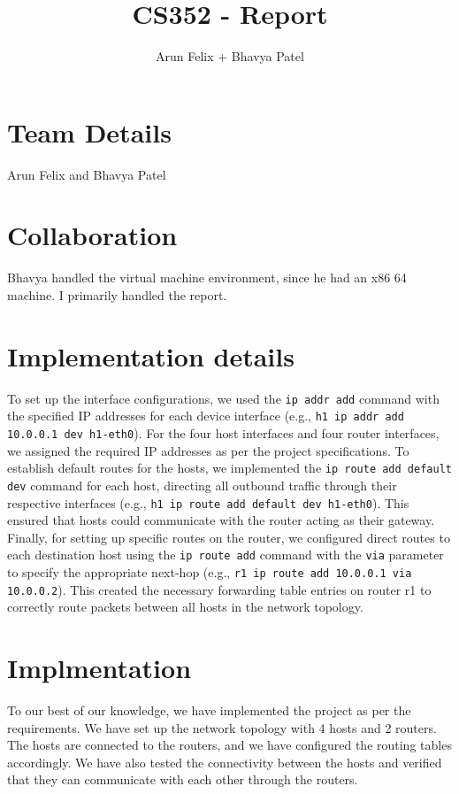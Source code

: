 \documentclass{article}
\title{CS352 - Report}
\author{Arun Felix + Bhavya Patel}
\begin{document}
\maketitle
\section{Team Details}

Arun Felix and Bhavya Patel

\section{Collaboration}

Bhavya handled the virtual machine environment, since he had an x86 64 machine. I primarily handled the report.

\section{Implementation details}
To set up the interface configurations, we used the \texttt{ip addr add} command with the specified IP addresses for each device interface (e.g., \texttt{h1 ip addr add 10.0.0.1 dev h1-eth0}). For the four host interfaces and four router interfaces, we assigned the required IP addresses as per the project specifications. To establish default routes for the hosts, we implemented the \texttt{ip route add default dev} command for each host, directing all outbound traffic through their respective interfaces (e.g., \texttt{h1 ip route add default dev h1-eth0}). This ensured that hosts could communicate with the router acting as their gateway. Finally, for setting up specific routes on the router, we configured direct routes to each destination host using the \texttt{ip route add} command with the \texttt{via} parameter to specify the appropriate next-hop (e.g., \texttt{r1 ip route add 10.0.0.1 via 10.0.0.2}). This created the necessary forwarding table entries on router r1 to correctly route packets between all hosts in the network topology.

\section{Implmentation}
To our best of our knowledge, we have implemented the project as per the requirements. We have set up the network topology with 4 hosts and 2 routers. The hosts are connected to the routers, and we have configured the routing tables accordingly. We have also tested the connectivity between the hosts and verified that they can communicate with each other through the routers.
\end{document}
